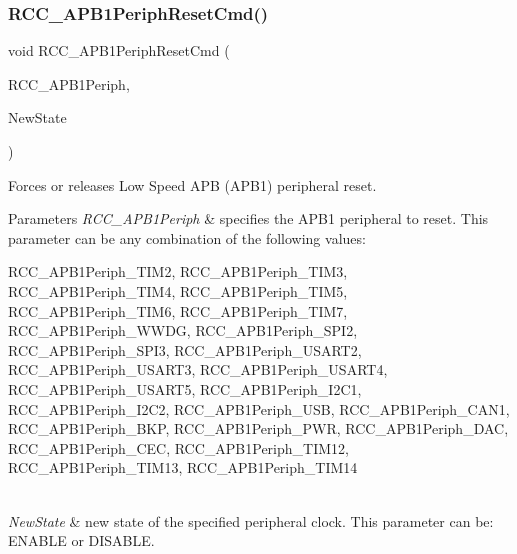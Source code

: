 \subsubsection{\texorpdfstring{R\+C\+C\+\_\+\+A\+P\+B1\+Periph\+Reset\+Cmd()}{RCC\_APB1PeriphResetCmd()}}
{\footnotesize\ttfamily void R\+C\+C\+\_\+\+A\+P\+B1\+Periph\+Reset\+Cmd (\begin{DoxyParamCaption}\item[{uint32\+\_\+t}]{R\+C\+C\+\_\+\+A\+P\+B1\+Periph,  }\item[{\hyperlink{group___exported__types_gac9a7e9a35d2513ec15c3b537aaa4fba1}{Functional\+State}}]{New\+State }\end{DoxyParamCaption})}



Forces or releases Low Speed A\+PB (A\+P\+B1) peripheral reset. 


\begin{DoxyParams}{Parameters}
{\em R\+C\+C\+\_\+\+A\+P\+B1\+Periph} & specifies the A\+P\+B1 peripheral to reset. This parameter can be any combination of the following values\+: \begin{DoxyItemize}
\item R\+C\+C\+\_\+\+A\+P\+B1\+Periph\+\_\+\+T\+I\+M2, R\+C\+C\+\_\+\+A\+P\+B1\+Periph\+\_\+\+T\+I\+M3, R\+C\+C\+\_\+\+A\+P\+B1\+Periph\+\_\+\+T\+I\+M4, R\+C\+C\+\_\+\+A\+P\+B1\+Periph\+\_\+\+T\+I\+M5, R\+C\+C\+\_\+\+A\+P\+B1\+Periph\+\_\+\+T\+I\+M6, R\+C\+C\+\_\+\+A\+P\+B1\+Periph\+\_\+\+T\+I\+M7, R\+C\+C\+\_\+\+A\+P\+B1\+Periph\+\_\+\+W\+W\+DG, R\+C\+C\+\_\+\+A\+P\+B1\+Periph\+\_\+\+S\+P\+I2, R\+C\+C\+\_\+\+A\+P\+B1\+Periph\+\_\+\+S\+P\+I3, R\+C\+C\+\_\+\+A\+P\+B1\+Periph\+\_\+\+U\+S\+A\+R\+T2, R\+C\+C\+\_\+\+A\+P\+B1\+Periph\+\_\+\+U\+S\+A\+R\+T3, R\+C\+C\+\_\+\+A\+P\+B1\+Periph\+\_\+\+U\+S\+A\+R\+T4, R\+C\+C\+\_\+\+A\+P\+B1\+Periph\+\_\+\+U\+S\+A\+R\+T5, R\+C\+C\+\_\+\+A\+P\+B1\+Periph\+\_\+\+I2\+C1, R\+C\+C\+\_\+\+A\+P\+B1\+Periph\+\_\+\+I2\+C2, R\+C\+C\+\_\+\+A\+P\+B1\+Periph\+\_\+\+U\+SB, R\+C\+C\+\_\+\+A\+P\+B1\+Periph\+\_\+\+C\+A\+N1, R\+C\+C\+\_\+\+A\+P\+B1\+Periph\+\_\+\+B\+KP, R\+C\+C\+\_\+\+A\+P\+B1\+Periph\+\_\+\+P\+WR, R\+C\+C\+\_\+\+A\+P\+B1\+Periph\+\_\+\+D\+AC, R\+C\+C\+\_\+\+A\+P\+B1\+Periph\+\_\+\+C\+EC, R\+C\+C\+\_\+\+A\+P\+B1\+Periph\+\_\+\+T\+I\+M12, R\+C\+C\+\_\+\+A\+P\+B1\+Periph\+\_\+\+T\+I\+M13, R\+C\+C\+\_\+\+A\+P\+B1\+Periph\+\_\+\+T\+I\+M14 \end{DoxyItemize}
\\
\hline
{\em New\+State} & new state of the specified peripheral clock. This parameter can be\+: E\+N\+A\+B\+LE or D\+I\+S\+A\+B\+LE. \\
\hline
\end{DoxyParams}

